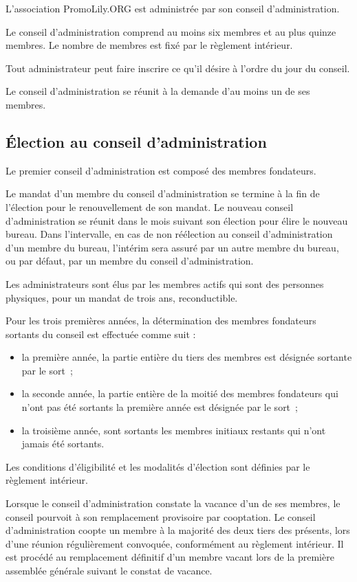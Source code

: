 \documentclass[a4wide,12pt]{scrartcl}
\newcommand{\nomAssoc}{PromoLily.ORG\xspace}
\begin{document}
L'association \nomAssoc est administrée par son conseil
d'administration.

Le conseil d'administration comprend au moins six membres et au plus
quinze membres. Le nombre de membres est fixé par le règlement
intérieur.

Tout administrateur peut faire inscrire ce qu'il désire à l'ordre du
jour du conseil.

Le conseil d’administration se réunit à la demande d’au moins un de
ses membres.

\subsection{Élection au conseil d'administration}

Le premier conseil d'administration est composé des membres
fondateurs.

Le mandat d'un membre du conseil d'administration se termine à la fin
de l'élection pour le renouvellement de son mandat. Le nouveau conseil
d'administration se réunit dans le mois suivant son élection pour
élire le nouveau bureau. Dans l'intervalle, en cas de non réélection
au conseil d'administration d'un membre du bureau, l'intérim sera
assuré par un autre membre du bureau, ou par défaut, par un membre du
conseil d'administration.

Les administrateurs sont élus par les membres actifs qui sont des
personnes physiques, pour un mandat de trois ans, reconductible.

Pour les trois premières années, la détermination des membres
fondateurs sortants du conseil est effectuée comme suit :
\begin{itemize}
\item la première année, la partie entière du tiers des membres est
  désignée sortante par le sort~;
\item la seconde année, la partie entière de la moitié des membres
  fondateurs qui n'ont pas été sortants la première année est désignée
  par le sort~;
\item la troisième année, sont sortants les membres initiaux restants qui
n'ont jamais été sortants.
\end{itemize}

Les conditions d'éligibilité et les modalités d'élection sont définies
par le règlement intérieur.

Lorsque le conseil d'administration constate la vacance d'un de ses
membres, le conseil pourvoit à son remplacement provisoire par
cooptation. Le conseil d'administration coopte un membre à la majorité
des deux tiers des présents, lors d'une réunion régulièrement
convoquée, conformément au règlement intérieur. Il est procédé au
remplacement définitif d'un membre vacant lors de la première
assemblée générale suivant le constat de vacance.
\end{document}
